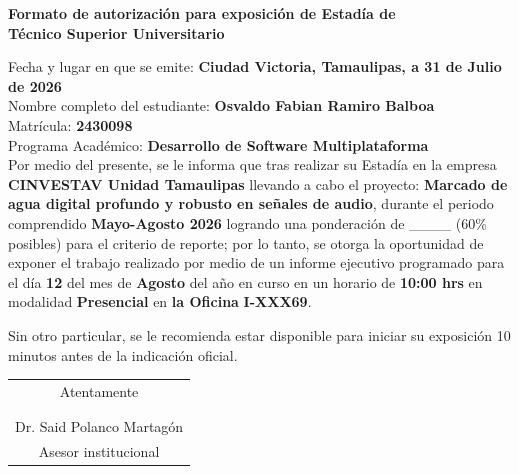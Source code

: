 \documentclass[12pt]{article}
\newcommand{\NombreAlumno}{Osvaldo Fabian Ramiro Balboa}
\newcommand{\NombreProyecto}{Marcado de agua digital profundo y robusto en señales de audio}
\newcommand{\UnidadEconomica}{CINVESTAV Unidad Tamaulipas}
\newcommand{\nasesorinstitucional}{Dr. Said Polanco Martagón}
\newcommand{\Matricula}           {2430098}  %
\newcommand{\ncuatrimestre}{Mayo-Agosto 2026}
\newcommand{\fechaAutorizacionInforme}               {31 de Julio de 2026}
\newcommand{\DiaEvaluacionPesentacion}{12}
\newcommand{\MesEvaluacionPesentacion}{Agosto}
\newcommand{\HoraEvaluacionPesentacion}{10:00 hrs}
\newcommand{\modalidadEvaluacionPesentacion}{Presencial} %
\newcommand{\tipoAulaOficinaEnlacePesentacion}{la Oficina} %
\newcommand{\AulaEvaluacionOEnlaceMeetPesentacion}{I-XXX69} %
\newcommand{\ncarrera}            {Desarrollo de Software Multiplataforma}
\begin{document}
\newpage
\setcounter{page}{0}
\pagestyle{empty}
\vspace*{2cm}



\begin{center}
  {\Large \textbf{Formato de autorización para exposición de Estadía de}}\\[0.125cm]
  {\Large \textbf{Técnico Superior Universitario}}\\[0.25cm]
\end{center}

\noindent
Fecha y lugar en que se emite: \textbf{Ciudad Victoria, Tamaulipas, a \fechaAutorizacionInforme } \\[0.125cm]
Nombre completo del estudiante: \textbf{\NombreAlumno} \\[0.125cm]
Matrícula: \textbf{\Matricula}  \\[0.125cm]
Programa Académico: \textbf{\ncarrera}  \\[0.25cm]

\noindent
Por medio del presente, se le informa que tras realizar su Estadía en la empresa \textbf{\UnidadEconomica} llevando a cabo el proyecto: \textbf{\NombreProyecto}, durante el periodo comprendido \textbf{\ncuatrimestre} logrando una ponderación de \_\_\_\_  (60\% posibles) para el criterio de reporte; por lo tanto, se otorga la oportunidad de exponer el trabajo realizado por medio de un informe ejecutivo programado para el día \textbf{\DiaEvaluacionPesentacion} del mes de \textbf{\MesEvaluacionPesentacion} del año en curso en un horario de \textbf{\HoraEvaluacionPesentacion} en modalidad \textbf{\modalidadEvaluacionPesentacion} en \textbf{\tipoAulaOficinaEnlacePesentacion} \textbf{\AulaEvaluacionOEnlaceMeetPesentacion}.

\vspace{0.25cm}

\noindent
Sin otro particular, se le recomienda estar disponible para iniciar su exposición 10 minutos antes de la indicación oficial.

\vspace{0.5cm}

\begin{center}
  \begin{tabular}{p{10cm}}
    \multicolumn{1}{c}{Atentamente}           \\
    \\
    \\ \hline
    \multicolumn{1}{c}{\nasesorinstitucional} \\
    \multicolumn{1}{c}{Asesor institucional}  \\
  \end{tabular}
\end{center}
\end{document}
